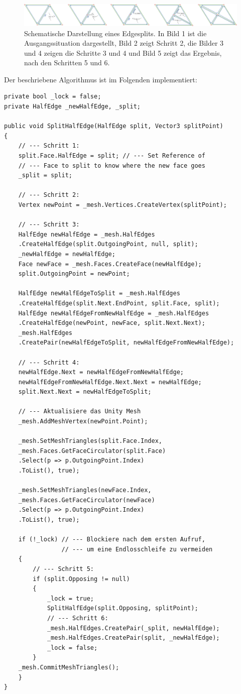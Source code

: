 \begin{figure}[H]
	\centering
	\includegraphics[width=1\linewidth]{Images/splitHalfEdge}
	\caption{Schematische Darstellung eines Edgesplits. In Bild 1 ist die Ausgangssituation dargestellt, Bild 2 zeigt Schritt 2, die Bilder 3 und 4 zeigen die Schritte 3 und 4 und Bild 5 zeigt das Ergebnis, nach den Schritten 5 und 6.}
	\label{fig:splithalfedge}
\end{figure}


Der beschriebene Algorithmus ist im Folgenden implementiert:
\begin{lstlisting}
private bool _lock = false;
private HalfEdge _newHalfEdge, _split;

public void SplitHalfEdge(HalfEdge split, Vector3 splitPoint)
{
	// --- Schritt 1:
	split.Face.HalfEdge = split; // --- Set Reference of 
	// --- Face to split to know where the new face goes
	_split = split;

	// --- Schritt 2:
	Vertex newPoint = _mesh.Vertices.CreateVertex(splitPoint);

	// --- Schritt 3:
	HalfEdge newHalfEdge = _mesh.HalfEdges
	.CreateHalfEdge(split.OutgoingPoint, null, split);
	_newHalfEdge = newHalfEdge;
	Face newFace = _mesh.Faces.CreateFace(newHalfEdge);
	split.OutgoingPoint = newPoint;

	HalfEdge newHalfEdgeToSplit = _mesh.HalfEdges
	.CreateHalfEdge(split.Next.EndPoint, split.Face, split);
	HalfEdge newHalfEdgeFromNewHalfEdge = _mesh.HalfEdges
	.CreateHalfEdge(newPoint, newFace, split.Next.Next);
	_mesh.HalfEdges
	.CreatePair(newHalfEdgeToSplit, newHalfEdgeFromNewHalfEdge);

	// --- Schritt 4:
	newHalfEdge.Next = newHalfEdgeFromNewHalfEdge;
	newHalfEdgeFromNewHalfEdge.Next.Next = newHalfEdge;
	split.Next.Next = newHalfEdgeToSplit;

	// --- Aktualisiere das Unity Mesh
	_mesh.AddMeshVertex(newPoint.Point);
	
	_mesh.SetMeshTriangles(split.Face.Index,
	_mesh.Faces.GetFaceCirculator(split.Face)
	.Select(p => p.OutgoingPoint.Index)
	.ToList(), true);
	 
	_mesh.SetMeshTriangles(newFace.Index,
	_mesh.Faces.GetFaceCirculator(newFace)
	.Select(p => p.OutgoingPoint.Index)
	.ToList(), true);
	
	if (!_lock) // --- Blockiere nach dem ersten Aufruf,
				// --- um eine Endlosschleife zu vermeiden
	{
		// --- Schritt 5:
		if (split.Opposing != null) 
		{
			_lock = true;
			SplitHalfEdge(split.Opposing, splitPoint);
			// --- Schritt 6:
			_mesh.HalfEdges.CreatePair(_split, newHalfEdge);
			_mesh.HalfEdges.CreatePair(split, _newHalfEdge);
			_lock = false;
		}
	_mesh.CommitMeshTriangles();
	}
}
\end{lstlisting}
